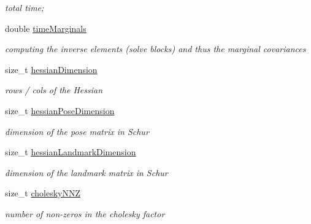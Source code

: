 \begin{DoxyCompactItemize}
\begin{DoxyCompactList}\small\item\em total time; \end{DoxyCompactList}\item 
\hypertarget{structg2o_1_1G2OBatchStatistics_a58e5d0960dc35e682424dce2b50e4fa9}{double \hyperlink{structg2o_1_1G2OBatchStatistics_a58e5d0960dc35e682424dce2b50e4fa9}{time\-Marginals}}\label{structg2o_1_1G2OBatchStatistics_a58e5d0960dc35e682424dce2b50e4fa9}

\begin{DoxyCompactList}\small\item\em computing the inverse elements (solve blocks) and thus the marginal covariances \end{DoxyCompactList}\item 
\hypertarget{structg2o_1_1G2OBatchStatistics_a618a15ba153da1a99b19a2d779cf3764}{size\-\_\-t \hyperlink{structg2o_1_1G2OBatchStatistics_a618a15ba153da1a99b19a2d779cf3764}{hessian\-Dimension}}\label{structg2o_1_1G2OBatchStatistics_a618a15ba153da1a99b19a2d779cf3764}

\begin{DoxyCompactList}\small\item\em rows / cols of the Hessian \end{DoxyCompactList}\item 
\hypertarget{structg2o_1_1G2OBatchStatistics_ae2af64720e3f99557924b9cf92ab6f20}{size\-\_\-t \hyperlink{structg2o_1_1G2OBatchStatistics_ae2af64720e3f99557924b9cf92ab6f20}{hessian\-Pose\-Dimension}}\label{structg2o_1_1G2OBatchStatistics_ae2af64720e3f99557924b9cf92ab6f20}

\begin{DoxyCompactList}\small\item\em dimension of the pose matrix in Schur \end{DoxyCompactList}\item 
\hypertarget{structg2o_1_1G2OBatchStatistics_a0cfa7018402074f47defb9cd5d9d4b64}{size\-\_\-t \hyperlink{structg2o_1_1G2OBatchStatistics_a0cfa7018402074f47defb9cd5d9d4b64}{hessian\-Landmark\-Dimension}}\label{structg2o_1_1G2OBatchStatistics_a0cfa7018402074f47defb9cd5d9d4b64}

\begin{DoxyCompactList}\small\item\em dimension of the landmark matrix in Schur \end{DoxyCompactList}\item 
\hypertarget{structg2o_1_1G2OBatchStatistics_a5996c5ba000bdfcbcf5c0375a3c62643}{size\-\_\-t \hyperlink{structg2o_1_1G2OBatchStatistics_a5996c5ba000bdfcbcf5c0375a3c62643}{cholesky\-N\-N\-Z}}\label{structg2o_1_1G2OBatchStatistics_a5996c5ba000bdfcbcf5c0375a3c62643}

\begin{DoxyCompactList}\small\item\em number of non-\/zeros in the cholesky factor \end{DoxyCompactList}\end{DoxyCompactItemize}
